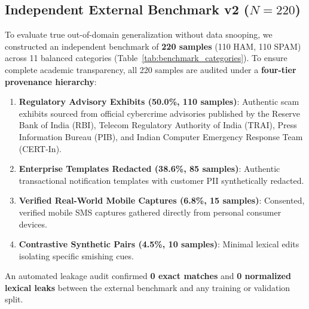\documentclass[conference]{IEEEtran}
\begin{document}
\subsection{Independent External Benchmark v2 ($N=220$)}
To evaluate true out-of-domain generalization without data snooping, we constructed an independent benchmark of \textbf{220 samples} (110 HAM, 110 SPAM) across 11 balanced categories (Table~\ref{tab:benchmark_categories}). To ensure complete academic transparency, all 220 samples are audited under a \textbf{four-tier provenance hierarchy}:
\begin{enumerate}
    \item \textbf{Regulatory Advisory Exhibits (50.0\%, 110 samples)}: Authentic scam exhibits sourced from official cybercrime advisories published by the Reserve Bank of India (RBI), Telecom Regulatory Authority of India (TRAI), Press Information Bureau (PIB), and Indian Computer Emergency Response Team (CERT-In).
    \item \textbf{Enterprise Templates Redacted (38.6\%, 85 samples)}: Authentic transactional notification templates with customer PII synthetically redacted.
    \item \textbf{Verified Real-World Mobile Captures (6.8\%, 15 samples)}: Consented, verified mobile SMS captures gathered directly from personal consumer devices.
    \item \textbf{Contrastive Synthetic Pairs (4.5\%, 10 samples)}: Minimal lexical edits isolating specific smishing cues.
\end{enumerate}

An automated leakage audit confirmed \textbf{0 exact matches} and \textbf{0 normalized lexical leaks} between the external benchmark and any training or validation split.
\end{document}
